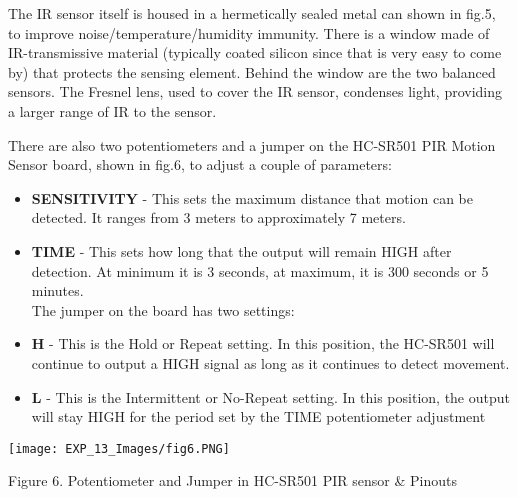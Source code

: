 \documentclass[12pt,a4paper]{article}
\begin{document}
\begin{justify}
\noindent The IR sensor itself is housed in a hermetically sealed metal can shown in fig.5, to improve noise/temperature/humidity immunity. There is a window made of IR-transmissive material (typically coated silicon since that is very easy to come by) that protects the sensing element. Behind the window are the two balanced sensors. The Fresnel lens, used to cover the IR sensor, condenses light, providing a larger range of IR to the sensor.\par
\noindent There are also two potentiometers and a jumper on the HC-SR501 PIR Motion Sensor board, shown in fig.6, to adjust a couple of parameters:
\vspace{-3mm}
\begin{itemize}
\setlength\itemsep{-0.3em}
\item \textbf{SENSITIVITY} - This sets the maximum distance that motion can be detected. It ranges from 3 meters to approximately 7 meters. 
\item \textbf{TIME} -  This sets how long that the output will remain HIGH after detection. At minimum it is 3 seconds, at maximum, it is 300 seconds or 5 minutes.\\[6pt]
The jumper on the board has two settings:
\item \textbf{H} - This is the Hold or Repeat setting. In this position, the HC-SR501 will continue to output a HIGH signal as long as it continues to detect movement.
\item \textbf{L} - This is the Intermittent or No-Repeat setting. In this position, the output will stay HIGH for the period set by the TIME potentiometer adjustment
\end{itemize}
\vspace{-6mm}
\begin{center} 
\texttt{[image: EXP\_13\_Images/fig6.PNG]}
\end{center}
\vspace{-5mm}
\begin{center} {Figure 6. Potentiometer and Jumper in HC-SR501 PIR sensor \& Pinouts}\end{center}



\end{justify}
\end{document}
